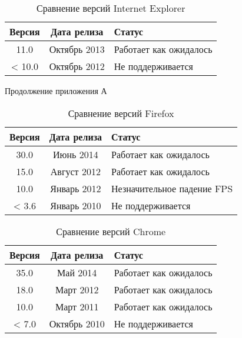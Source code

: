 \begin{table}[h!]
  \captionsetup{width=0.6\textwidth}
  \caption{\label{tab:brows:ie}Сравнение версий Internet Explorer}
  \begin{center}
    \begin{tabular}{|c|c|l|}
      \hline
      Версия & Дата релиза & Статус \\
      \hline
      11.0 & Октябрь 2013 & Работает как ожидалось \\
      < 10.0 & Октябрь 2012 & Не поддерживается \\
      \hline
    \end{tabular}
  \end{center}
\end{table}

\newpage
\begin{flushright}
  Продолжение приложения А
\end{flushright}



\begin{table}[h!]
  \captionsetup{width=0.68\textwidth}
  \caption{\label{tab:brows:ff}Сравнение версий Firefox}
  \begin{center}
    \begin{tabular}{|c|c|l|}
      \hline
      Версия & Дата релиза & Статус \\
      \hline
      30.0 & Июнь 2014 & Работает как ожидалось \\
      15.0 & Август 2012 & Работает как ожидалось \\
      10.0 & Январь 2012 & Незначительное падение FPS \\
      < 3.6 & Январь 2010 & Не поддерживается \\
      \hline
    \end{tabular}
  \end{center}
\end{table}

\begin{table}[h!]
  \captionsetup{width=0.6\textwidth}
  \caption{\label{tab:brows:chrome}Сравнение версий Chrome}
  \begin{center}
    \begin{tabular}{|c|c|l|}
      \hline
      Версия & Дата релиза & Статус \\
      \hline
      35.0 & Май 2014 & Работает как ожидалось \\
      18.0 & Март 2012 & Работает как ожидалось \\
      10.0 & Март 2011 & Работает как ожидалось \\
      < 7.0 & Октябрь 2010 & Не поддерживается \\
      \hline
    \end{tabular}
  \end{center}
\end{table}

